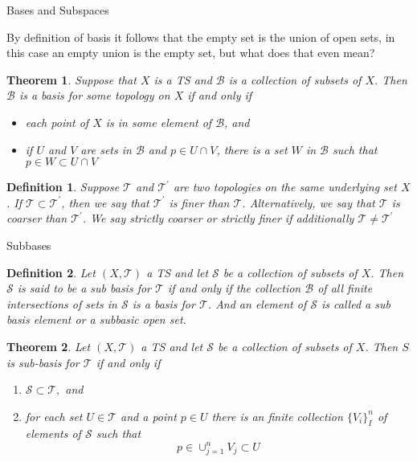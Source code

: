 \documentclass[12pt]{article}
\newtheorem{definition}{Definition}
\newtheorem{theorem}{Theorem}
\begin{document}
\begin{section}{Bases and Subspaces}
\begin{tcolorbox}
By definition of basis it follows that the empty set is the union of open sets, in this case an empty union is the empty set, but what does that even mean?
\end{tcolorbox}

\begin{theorem}
Suppose that $X$ is a TS and $\mathcal{B}$ is a collection of subsets of $X$. Then $\mathcal{B}$ is a basis for some topology on $X$ if and only if 
	\begin{itemize}
		\item each point of $X$ is in some element of $\mathcal{B}$, and
		\item if $U$ and $V$ are sets in $\mathcal{B}$ and $p\in U\cap V$, there is a set $W$ in $\mathcal{B}$ such that $p\in W\subset U\cap V$
	\end{itemize}
\end{theorem}

\begin{definition}
Suppose $\mathcal{T}$ and $\mathcal{T}^{\prime}$ are two topologies on the same underlying set $X$. If $\mathcal{T}\subset\mathcal{T}^{\prime}$, then we say that $\mathcal{T}^{\prime}$ is finer than $\mathcal{T}$. Alternatively, we say that $\mathcal{T}$ is coarser than  $\mathcal{T}^{\prime}$. We say strictly coarser or strictly finer if additionally $\mathcal{T}\neq\mathcal{T}^{\prime}$
\end{definition}

\begin{subsection}{Subbases}

\begin{definition}
Let $\left(X, \mathcal{T}\right)$ a TS and let $\mathcal{S}$ be a collection of subsets of $X$. Then $\mathcal{S}$ is said to be a sub basis for $\mathcal{T}$ if and only if the collection $\mathcal{B}$ of all finite intersections of sets in $\mathcal{S}$ is a basis for $\mathcal{T}$. And an element of $\mathcal{S}$ is called a sub basis element or a subbasic open set.
\end{definition}

\begin{theorem}
Let $\left(X, \mathcal{T}\right)$ a TS and let $\mathcal{S}$ be a collection of subsets of $X$. Then $S$ is sub-basis for $\mathcal{T}$ if and only if
	\begin{enumerate}
	\item $\mathcal{S}\subset\mathcal{T},$ and
	\item for each set $U\in \mathcal{T}$ and a point $p\in U$ there is an finite collection $\{ V_{i}\}_{I}^{n}$ of elements of $\mathcal{S}$ such that 
	$$ 
		p\in \cup_{j=1}^{n}V_{j}\subset U
	$$
	\end{enumerate}
\end{theorem}


\end{subsection}
\end{section}
\end{document}
